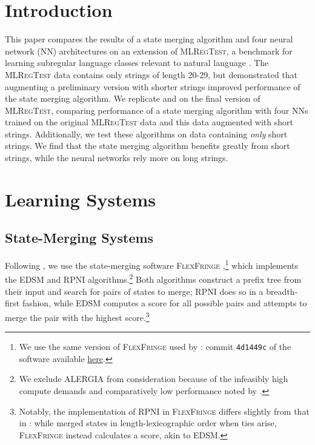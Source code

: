 \documentclass[11pt]{article}
\newcommand{\todo}[1]{\textcolor{red}{(TODO: {#1})}}
\newcommand{\logan}[1]{\textcolor{orange}{(LS: {#1})}}
\begin{document}
\section{Introduction}
This paper compares the results of a state merging algorithm and four neural network (NN) architectures on an extension of \textsc{MLRegTest}, a benchmark for learning subregular language classes relevant to natural language \citep{mlregtest}.
The \textsc{MLRegTest} data contains only strings of length 20-29, but \citet{adil23} demonstrated that augmenting a preliminary version with shorter strings improved performance of the state merging algorithm. 
We replicate \citeauthor{adil23} and \citeauthor{mlregtest} on the final version of \textsc{MLRegTest}, comparing performance of a state merging algorithm with four NNs trained on the original \textsc{MLRegTest} data and this data augmented with short strings. Additionally, we test these algorithms on data containing \textit{only} short strings.  
We find that the state merging algorithm benefits greatly from short strings, while the neural networks rely  more on long strings. 


\section{Learning Systems} \label{sec:bg}

\subsection{State-Merging Systems}\label{sec:ff}
Following \citet{adil23}, we use the state-merging software  \textsc{FlexFringe} \citep{flexfringe},\footnote{We use the same version of \textsc{FlexFringe} used by \citeauthor{adil23}: commit \texttt{4d1449c} of the software available 
\href{https://github.com/tudelft-cda-lab/FlexFringe/commit/4d1449c4d0cfb3fc5f9a954d5c3a24a11a593a5c\#diff-67290ef9e84d355c83cbd9a0bda3be39e2e14836990458cfcc070506a7e448c2}{here}.
}
which implements the EDSM \citep{edsm} and RPNI \citep{rpni} algorithms.\footnote{We exclude ALERGIA from consideration because of the infeasibly high compute demands and comparatively low performance noted by \citeauthor{adil23}.} 
Both algorithms construct a prefix tree from their input and search for pairs of states to merge; RPNI does so in a breadth-first fashion, while EDSM  computes a score for all possible pairs and attempts to merge the pair with the highest score.\footnote{Notably, the implementation of RPNI in \textsc{FlexFringe} differs slightly from that in \citet{rpni}: while \citeauthor{rpni} merged states in length-lexicographic order when ties arise, \textsc{FlexFringe} instead calculates a score, akin to EDSM. } 
\end{document}
